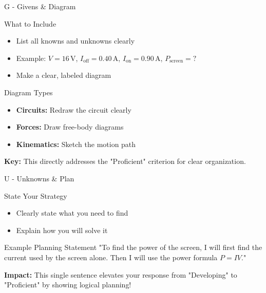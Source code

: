 \documentclass{beamer}
\begin{document}
\begin{frame}{G - Givens \& Diagram}
\begin{block}{What to Include}
\begin{itemize}
\item List all knowns and unknowns clearly
\item Example: $V = 16\,\text{V}$, $I_{\text{off}} = 0.40\,\text{A}$, $I_{\text{on}} = 0.90\,\text{A}$, $P_{\text{screen}} = ?$
\item Make a clear, labeled diagram
\end{itemize}
\end{block}

\begin{block}{Diagram Types}
\begin{itemize}
\item \textbf{Circuits:} Redraw the circuit clearly
\item \textbf{Forces:} Draw free-body diagrams
\item \textbf{Kinematics:} Sketch the motion path
\end{itemize}
\end{block}

\textbf{Key:} This directly addresses the "Proficient" criterion for clear organization.
\end{frame}

\begin{frame}{U - Unknowns \& Plan}
\begin{block}{State Your Strategy}
\begin{itemize}
\item Clearly state what you need to find
\item Explain how you will solve it
\end{itemize}
\end{block}

\begin{block}{Example Planning Statement}
"To find the power of the screen, I will first find the current used by the screen alone. Then I will use the power formula $P = IV$."
\end{block}

\textbf{Impact:} This single sentence elevates your response from "Developing" to "Proficient" by showing logical planning!

\end{frame}
\end{document}

